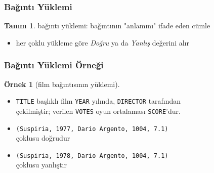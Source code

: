 \documentclass[dvipsnames]{beamer}
\theoremstyle{definition}
\newtheorem{tanim}[theorem]{Tanım}
\theoremstyle{example}
\newtheorem{ornek}[theorem]{Örnek}
\theoremstyle{plain}
\begin{document}
\begin{frame}
  \frametitle{Bağıntı Yüklemi}

  \begin{tanim}
    \alert{bağıntı yüklemi}: bağıntının "anlamını" ifade eden cümle
  \end{tanim}

  \begin{itemize}
    \item her çoklu yükleme göre \emph{Doğru} ya da \emph{Yanlış} değerini alır
  \end{itemize}
\end{frame}

\begin{frame}
  \frametitle{Bağıntı Yüklemi Örneği}

  \begin{ornek}[film bağıntısının yüklemi]
    \begin{itemize}
      \item \texttt{TITLE} başlıklı film \texttt{YEAR} yılında,
        \texttt{DIRECTOR} tarafından\\
        çekilmiştir; verilen \texttt{VOTES} oyun ortalaması \texttt{SCORE}'dur.

      \pause
      \medskip
      \item \texttt{(Suspiria, 1977, Dario Argento, 1004, 7.1)}\\
        çoklusu doğrudur
      \item \texttt{(Suspiria, 1978, Dario Argento, 1004, 7.1)}\\
        çoklusu yanlıştır
    \end{itemize}
  \end{ornek}
\end{frame}
\end{document}
